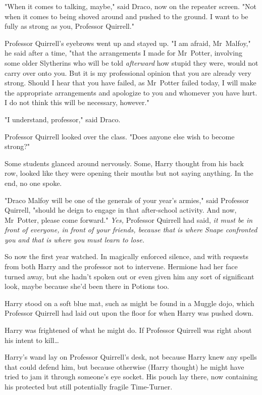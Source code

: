 "When it comes to talking, maybe," said Draco, now on the repeater screen. "Not
when it comes to being shoved around and pushed to the ground. I want to be
fully as strong as you, Professor Quirrell."

Professor Quirrell's eyebrows went up and stayed up. "I am afraid, Mr~Malfoy,"
he said after a time, "that the arrangements I made for Mr~Potter, involving
some older Slytherins who will be told \emph{afterward} how stupid they were,
would not carry over onto you. But it is my professional opinion that you are
already very strong. Should I hear that you have failed, as Mr~Potter failed
today, I will make the appropriate arrangements and apologize to you and
whomever you have hurt. I do not think this will be necessary, however."

"I understand, professor," said Draco.

Professor Quirrell looked over the class. "Does anyone else wish to become
strong?"

Some students glanced around nervously. Some, Harry thought from his back row,
looked like they were opening their mouths but not saying anything. In the end,
no one spoke.

"Draco Malfoy will be one of the generals of your year's armies," said
Professor Quirrell, "should he deign to engage in that after-school activity.
And now, Mr~Potter, please come forward."
\later
\emph{Yes,} Professor Quirrell had said, \emph{it must be in front of everyone,
in front of your friends, because that is where Snape confronted you and that
is where you must learn to lose.}

So now the first year watched. In magically enforced silence, and with requests
from both Harry and the professor not to intervene. Hermione had her face
turned away, but she hadn't spoken out or even given him any sort of
significant look, maybe because she'd been there in Potions too.

Harry stood on a soft blue mat, such as might be found in a Muggle dojo, which
Professor Quirrell had laid out upon the floor for when Harry was pushed down.

Harry was frightened of what he might do. If Professor Quirrell was right about
his intent to kill{\ldots}

Harry's wand lay on Professor Quirrell's desk, not because Harry knew any
spells that could defend him, but because otherwise (Harry thought) he might
have tried to jam it through someone's eye socket. His pouch lay there, now
containing his protected but still potentially fragile Time-Turner.

